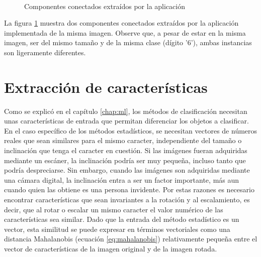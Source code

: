 \documentclass[a4paper, 11pt, oneside]{report}
\begin{document}
	\begin{figure}
	\centering
		\hspace{1cm}
		\\		
	\caption{Componentes conectados extraídos por la aplicación}
	\label{fig:concomp}
	\end{figure}
	
La figura \ref{fig:concomp} muestra dos componentes conectados extraídos por la aplicación implementada de la misma imagen. Observe que, a pesar de estar en la misma imagen, ser del mismo tamaño y de la misma clase (dígito '6'), ambas instancias son ligeramente diferentes.

\section{Extracción de características}

Como se explicó en el capítulo \ref{chap:ml}, los métodos de clasificación necesitan unas características de entrada que permitan diferenciar los objetos a clasificar. En el caso específico de los métodos estadísticos, se necesitan vectores de números reales que sean similares para el mismo caracter, independiente del tamaño o inclinación que tenga el caracter en cuestión. Si las imágenes fueran adquiridas mediante un escáner, la inclinación podría ser muy pequeña, incluso tanto que podría despreciarse. Sin embargo, cuando las imágenes son adquiridas mediante una cámara digital, la inclinación entra a ser un factor importante, más aun cuando quien las obtiene es una persona invidente. Por estas razones es necesario encontrar características que sean invariantes a la rotación y al escalamiento, es decir, que al rotar o escalar un mismo caracter el valor numérico de las características sea similar. Dado que la entrada del método estadístico es un vector, esta similitud se puede expresar en términos vectoriales como una distancia Mahalanobis (ecuación \ref{eq:mahalanobis}) relativamente pequeña entre el vector de características de la imagen original y de la imagen rotada.
\end{document}
